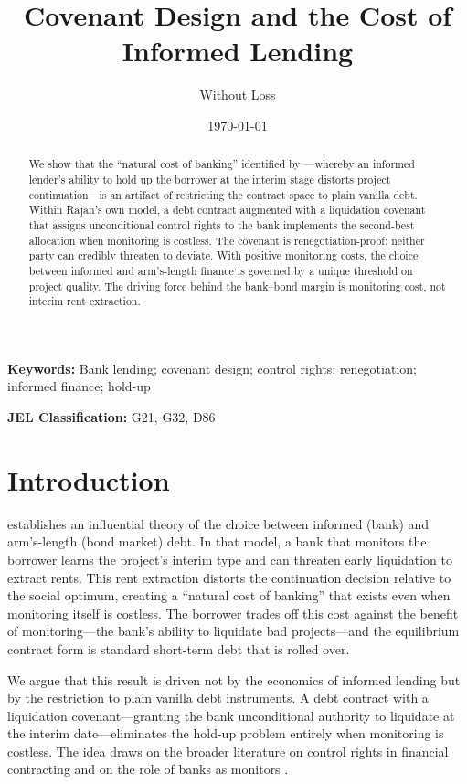 \documentclass[12pt,a4paper]{article}
\title{Covenant Design and the Cost of Informed Lending}
\author{Without Loss}
\date{\today}
\theoremstyle{plain}
\theoremstyle{definition}
\theoremstyle{remark}
\begin{document}
\maketitle

\begin{abstract}
\noindent
We show that the ``natural cost of banking'' identified by \citet{rajan1992}---whereby an informed lender's ability to hold up the borrower at the interim stage distorts project continuation---is an artifact of restricting the contract space to plain vanilla debt. Within Rajan's own model, a debt contract augmented with a liquidation covenant that assigns unconditional control rights to the bank implements the second-best allocation when monitoring is costless. The covenant is renegotiation-proof: neither party can credibly threaten to deviate. With positive monitoring costs, the choice between informed and arm's-length finance is governed by a unique threshold on project quality. The driving force behind the bank--bond margin is monitoring cost, not interim rent extraction.
\end{abstract}

\bigskip
\noindent \textbf{Keywords:} Bank lending; covenant design; control rights; renegotiation; informed finance; hold-up

\bigskip
\noindent \textbf{JEL Classification:} G21, G32, D86

\section{Introduction}

\citet{rajan1992} establishes an influential theory of the choice between informed (bank) and arm's-length (bond market) debt. In that model, a bank that monitors the borrower learns the project's interim type and can threaten early liquidation to extract rents. This rent extraction distorts the continuation decision relative to the social optimum, creating a ``natural cost of banking'' that exists even when monitoring itself is costless. The borrower trades off this cost against the benefit of monitoring---the bank's ability to liquidate bad projects---and the equilibrium contract form is standard short-term debt that is rolled over.

We argue that this result is driven not by the economics of informed lending but by the restriction to plain vanilla debt instruments. A debt contract with a liquidation covenant---granting the bank unconditional authority to liquidate at the interim date---eliminates the hold-up problem entirely when monitoring is costless. The idea draws on the broader literature on control rights in financial contracting \citep{aghionbolton1992} and on the role of banks as monitors \citep{diamond1984, diamond1991}.
\end{document}
